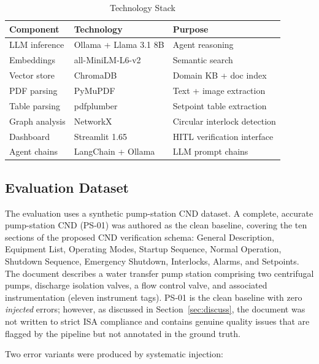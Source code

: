 \documentclass[journal]{IEEEtran}
\begin{document}
\begin{table}[!t]
\caption{Technology Stack}
\label{tab:stack}
\centering
\renewcommand{\arraystretch}{1.2}
\begin{tabular}{lll}
\toprule
\textbf{Component} & \textbf{Technology} & \textbf{Purpose} \\
\midrule
LLM inference  & Ollama + Llama 3.1 8B & Agent reasoning \\
Embeddings     & all-MiniLM-L6-v2~\cite{reimers2019} & Semantic search \\
Vector store   & ChromaDB~\cite{chromadb} & Domain KB + doc index \\
PDF parsing    & PyMuPDF               & Text + image extraction \\
Table parsing  & pdfplumber            & Setpoint table extraction \\
Graph analysis & NetworkX              & Circular interlock detection \\
Dashboard      & Streamlit 1.65        & HITL verification interface \\
Agent chains   & LangChain + Ollama    & LLM prompt chains \\
\bottomrule
\end{tabular}
\end{table}

\subsection{Evaluation Dataset}

The evaluation uses a synthetic pump-station CND dataset. A complete, accurate
pump-station CND (PS-01) was authored as the clean baseline, covering the ten
sections of the proposed CND verification schema: General Description, Equipment
List, Operating Modes, Startup Sequence, Normal Operation, Shutdown Sequence,
Emergency Shutdown, Interlocks, Alarms, and Setpoints. The document describes a
water transfer pump station comprising two centrifugal pumps, discharge isolation
valves, a flow control valve, and associated instrumentation (eleven instrument
tags). PS-01 is the clean baseline with zero \textit{injected} errors; however,
as discussed in Section~\ref{sec:discuss}, the document was not written to strict
ISA compliance and contains genuine quality issues that are flagged by the
pipeline but not annotated in the ground truth.

Two error variants were produced by systematic injection:
\end{document}

